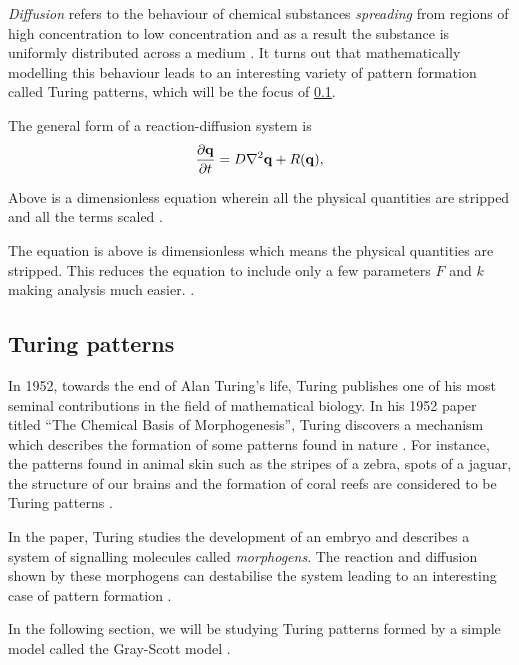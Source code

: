 \documentclass[a4paper, 11pt]{article}
\begin{document}
\emph{Diffusion} refers to the behaviour of chemical substances \textit{spreading} from regions of high concentration to low concentration and as a result the substance is uniformly distributed across a medium \parencite{britannicadiffusion}. It turns out that mathematically modelling this behaviour leads to an interesting variety of pattern formation called Turing patterns, which will be the focus of \cref{sec:turing-patterns}.

The general form of a reaction-diffusion system is
\begin{equation} \label{eq:rd-general}
	\frac{\partial \mathbf{q}}{\partial t} = D \nabla^2 \mathbf{q} + R(\mathbf{q}),
\end{equation}

Above is a dimensionless equation wherein all the physical quantities are stripped and all the terms scaled \parencite{strogatz}. 


The equation is above is dimensionless which means the physical quantities are stripped. This reduces the equation to include only a few parameters $F$ and $k$ making analysis much easier. \parencite{strogatz}.


\subsection{Turing patterns}
\label{sec:turing-patterns}

In 1952, towards the end of Alan Turing's life, Turing publishes one of his most seminal contributions in the field of mathematical biology. In his 1952 paper titled ``The Chemical Basis of Morphogenesis'', Turing discovers a mechanism which describes the formation of some patterns found in nature \parencite{turing1952}. For instance, the patterns found in animal skin such as the stripes of a zebra, spots of a jaguar, the structure of our brains and the formation of coral reefs are considered to be Turing patterns \parencite{sheffieldturing}.

In the paper, Turing studies the development of an embryo and describes a system of signalling molecules called \emph{morphogens}. The reaction and diffusion shown by these morphogens can destabilise the system leading to an interesting case of pattern formation \parencite{turing1952}.

In the following section, we will be studying Turing patterns formed by a simple model called the Gray-Scott model .
\end{document}
